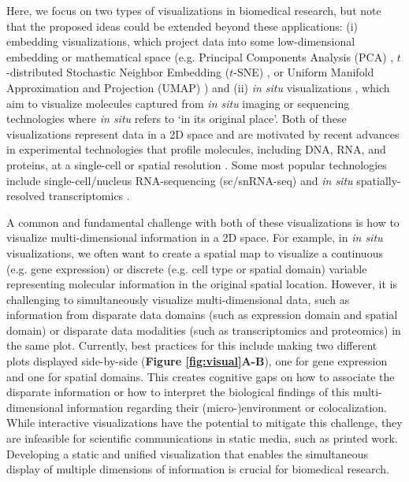 \documentclass[10pt,twocolumn]{article}
\begin{document}
Here, we focus on two types of visualizations in biomedical research, but note that the proposed ideas could be extended beyond these applications: (i) embedding visualizations, which project data into some low-dimensional embedding or mathematical space (e.g. Principal Components Analysis (PCA) \cite{hotelling_1933}, $t$-distributed Stochastic Neighbor Embedding ($t$-SNE) \cite{vandermaaten_2008}, or Uniform Manifold Approximation and Projection (UMAP) \cite{becht_2019}) and (ii) \textit{in situ} visualizations \cite{dries_2021, Lewis_2021, odonoghue_2021}, which aim to visualize molecules captured from \textit{in situ} imaging or sequencing technologies where \textit{in situ} refers to `in its original place'. Both of these visualizations represent data in a 2D space and are motivated by recent advances in experimental technologies that profile molecules, including DNA, RNA, and proteins, at a single-cell or spatial resolution \cite{kashima_2020, moffitt_2022}. Some most popular technologies include single-cell/nucleus RNA-sequencing (sc/snRNA-seq) \cite{aldridge_2020} and \textit{in situ} spatially-resolved transcriptomics \cite{larsson_2021}.  

A common and fundamental challenge with both of these visualizations is how to visualize multi-dimensional information in a 2D space. For example, in \textit{in situ} visualizations, we often want to create a spatial map to visualize a continuous (e.g. gene expression) or discrete (e.g. cell type or spatial domain) variable representing molecular information in the original spatial location. However, it is challenging to simultaneously visualize multi-dimensional data, such as information from disparate data domains (such as expression domain and spatial domain) or disparate data modalities (such as transcriptomics and proteomics) in the same plot. Currently, best practices for this include making two different plots displayed side-by-side (\textbf{Figure \textbf{\ref{fig:visual}A-B}}), one for gene expression and one for spatial domains. This creates cognitive gaps on how to associate the disparate information or how to interpret the biological findings of this multi-dimensional information regarding their (micro-)environment or colocalization. While interactive visualizations \cite{keller_2021, pardo_2022, sriworarat_2023} have the potential to mitigate this challenge, they are infeasible for scientific communications in static media, such as printed work. Developing a static and unified visualization that enables the simultaneous display of multiple dimensions of information is crucial for biomedical research.
\end{document}
